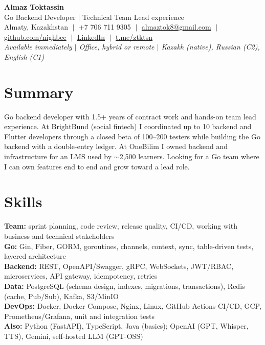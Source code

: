 \documentclass[10pt,a4paper]{article}
\begin{document}
\begin{center}
  {\LARGE \textbf{Almaz Toktassin}}\\[2pt]
  Go Backend Developer $|$ Technical Team Lead experience\\[3pt]
  Almaty, Kazakhstan $\;|\;$ +7 706 711 9305 $\;|\;$
  \href{mailto:almaztok8@gmail.com}{almaztok8@gmail.com} $\;|\;$
  \href{https://github.com/nighbee}{github.com/nighbee} $\;|\;$
  \href{https://www.linkedin.com/in/almaz-toktassin-5405922a9/}{LinkedIn} $\;|\;$
  \href{https://t.me/ztktsn}{t.me/ztktsn}\\
  \textit{Available immediately $|$ Office, hybrid or remote $|$ Kazakh (native), Russian (C2), English (C1)}
\end{center}

\section{Summary}
Go backend developer with 1.5+ years of contract work and hands-on team lead experience. At BrightBund (social fintech) I coordinated up to 10 backend and Flutter developers through a closed beta of 100--200 testers while building the Go backend with a double-entry ledger. At OneBilim I owned backend and infrastructure for an LMS used by $\sim$2,500 learners. Looking for a Go team where I can own features end to end and grow toward a lead role.

\section{Skills}
\textbf{Team:} sprint planning, code review, release quality, CI/CD, working with business and technical stakeholders\\
\textbf{Go:} Gin, Fiber, GORM, goroutines, channels, context, sync, table-driven tests, layered architecture\\
\textbf{Backend:} REST, OpenAPI/Swagger, gRPC, WebSockets, JWT/RBAC, microservices, API gateway, idempotency, retries\\
\textbf{Data:} PostgreSQL (schema design, indexes, migrations, transactions), Redis (cache, Pub/Sub), Kafka, S3/MinIO\\
\textbf{DevOps:} Docker, Docker Compose, Nginx, Linux, GitHub Actions CI/CD, GCP, Prometheus/Grafana, unit and integration tests\\
\textbf{Also:} Python (FastAPI), TypeScript, Java (basics); OpenAI (GPT, Whisper, TTS), Gemini, self-hosted LLM (GPT-OSS)
\end{document}
